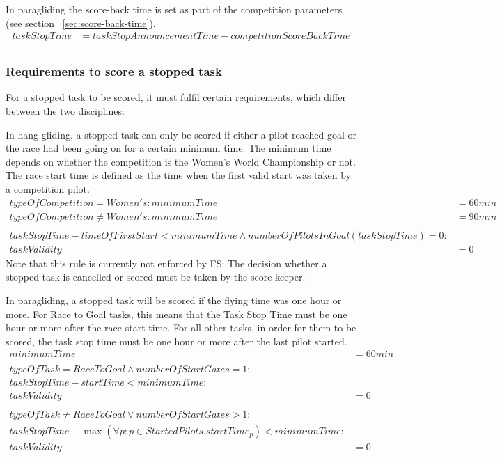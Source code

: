 \documentclass{article}
\begin{document}
\begin{pg}
In paragliding the score-back time is set as part of the competition parameters
(see section ~\ref{sec:score-back-time}).
\begin{align*}
    taskStopTime &= taskStopAnnouncementTime - competitionScoreBackTime \\
\end{align*}
\end{pg}

\subsubsection{Requirements to score a stopped task}
For a stopped task to be scored, it must fulfil certain requirements, which
differ between the two disciplines:

\begin{hg}
In hang gliding, a stopped task can only be scored if either a pilot reached
goal or the race had been going on for a certain minimum time. The minimum time
depends on whether the competition is the Women’s World Championship or not.
The race start time is defined as the time when the first valid start was taken
by a competition pilot.
\begin{align*}
    typeOfCompetition = Women's : minimumTime &= 60min \\
    typeOfCompetition \neq Women's : minimumTime &= 90min \\
    \\
    taskStopTime - timeOfFirstStart < minimumTime \land numberOfPilotsInGoal(taskStopTime) = 0 : \\
    taskValidity &= 0
\end{align*}
Note that this rule is currently not enforced by FS: The decision whether
a stopped task is cancelled or scored must be taken by the score keeper.
\end{hg}

\begin{pg}
In paragliding, a stopped task will be scored if the flying time was one hour
or more. For Race to Goal tasks, this means that the Task Stop Time must be one
hour or more after the race start time. For all other tasks, in order for them
to be scored, the task stop time must be one hour or more after the last pilot
started.
\begin{align*}
    minimumTime &= 60min \\
    \\
    typeOfTask = RaceToGoal \land numberOfStartGates = 1 : \\
    taskStopTime - startTime < minimumTime : \\
    taskValidity &= 0 \\
    \\
    typeOfTask \neq RaceToGoal \lor numberOfStartGates > 1 : \\
    taskStopTime - \max(\forall p : p \in StartedPilots . startTime_p) < minimumTime : \\
    taskValidity &= 0
\end{align*}
\end{pg}
\end{document}

